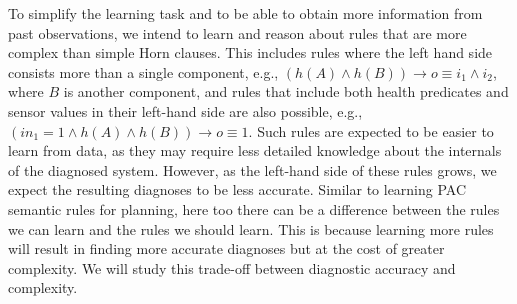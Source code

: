 \documentclass[12pt]{article}
\newcommand{\note}[1]{\textbf{\textit{#1}}}
\begin{document}
To simplify the learning task and to be able to obtain more information from past observations, we intend to learn and reason about rules that are more complex than simple Horn clauses. This includes rules where the left hand side consists more than a single component,  e.g., $(h(A)\wedge h(B)) \rightarrow o\equiv i_1\wedge i_2$, where $B$ is another component, 
and rules that include both health predicates and sensor values in their left-hand side are also possible, e.g., 
$(in_1=1 \wedge h(A) \wedge h(B))\rightarrow o\equiv 1$. Such rules are expected to be easier to learn from data, as they may require less detailed knowledge about the internals of the diagnosed system. 
However, as the left-hand side of these rules grows, we expect the resulting diagnoses to be less accurate. 
Similar to learning PAC semantic rules for planning, here too there can be a difference between the rules we can learn and the rules we should learn. This is because learning more rules will result in finding more accurate diagnoses but at the cost of greater complexity. We will study this trade-off between diagnostic accuracy and complexity. 


\end{document}
